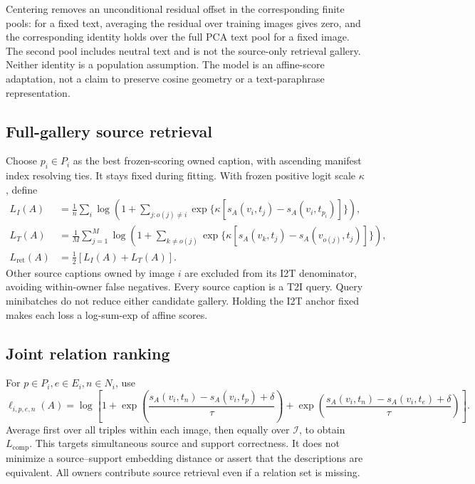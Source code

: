 \documentclass[11pt]{article}
\begin{document}
Centering removes an unconditional residual offset in the corresponding
finite pools: for a fixed text, averaging the residual over training images
gives zero, and the corresponding identity holds over the full PCA text
pool for a fixed image. The second pool includes neutral text and is not
the source-only retrieval gallery. Neither identity is a population
assumption. The model is an affine-score adaptation, not a claim to preserve
cosine geometry or a text-paraphrase representation.

\subsection{Full-gallery source retrieval}
Choose $p_i\in P_i$ as the best frozen-scoring owned caption, with ascending
manifest index resolving ties. It stays fixed during fitting. With frozen
positive logit scale $\kappa$, define
\begin{align}
 L_I(A)&=\frac1n\sum_i\log\left(1+\sum_{j:o(j)\ne i}
  \exp\{\kappa[s_A(v_i,t_j)-s_A(v_i,t_{p_i})]\}\right),\label{eq:i2t}\\
 L_T(A)&=\frac1M\sum_{j=1}^M\log\left(1+\sum_{k\ne o(j)}
  \exp\{\kappa[s_A(v_k,t_j)-s_A(v_{o(j)},t_j)]\}\right),\label{eq:t2i}\\
 L_{\mathrm{ret}}(A)&=\tfrac12[L_I(A)+L_T(A)].
\end{align}
Other source captions owned by image $i$ are excluded from its I2T
denominator, avoiding within-owner false negatives. Every source caption
is a T2I query. Query minibatches do not reduce either candidate gallery.
Holding the I2T anchor fixed makes each loss a log-sum-exp of affine scores.

\subsection{Joint relation ranking}
For $p\in P_i,e\in E_i,n\in N_i$, use
\begin{equation}
 \ell_{i,p,e,n}(A)=\log\left[
 1+\exp\!\left(\frac{s_A(v_i,t_n)-s_A(v_i,t_p)+\delta}{\tau}\right)
  +\exp\!\left(\frac{s_A(v_i,t_n)-s_A(v_i,t_e)+\delta}{\tau}\right)\right].
 \label{eq:joint}
\end{equation}
Average first over all triples within each image, then equally over
$\mathcal I$, to obtain $L_{\mathrm{comp}}$. This targets simultaneous
source and support correctness. It does not minimize a source--support
embedding distance or assert that the descriptions are equivalent.
All owners contribute source retrieval even if a relation set is missing.
\end{document}
